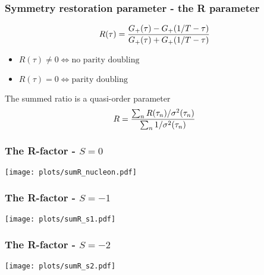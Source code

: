 \documentclass[11pt]{beamer}
\begin{document}
\begin{frame}
  \frametitle{Symmetry restoration parameter - the R parameter}

  \begin{equation*}
    R(\tau) = \frac{%
      G_+(\tau) - G_+(1/T - \tau)
      }{%
      G_+(\tau) + G_+(1/T - \tau)
    }
  \end{equation*}

  \begin{itemize}
    \item $R(\tau) \neq 0 \Leftrightarrow \text{no parity doubling}$
    \item $R(\tau) = 0 \Leftrightarrow \text{parity doubling}$
  \end{itemize}

  \vspace{5mm}

  The summed ratio is a quasi-order parameter \scalebox{0.8}{(as we will see)}
  \begin{equation*}
    R = \frac{%
      \sum_n R(\tau_n) / \sigma^2(\tau_n)
      }{%
      \sum_n 1 / \sigma^2(\tau_n)
    }
  \end{equation*}

\end{frame}

\begin{frame}
  \frametitle{The R-factor - $S = 0$}

  \vspace{6mm}
  \begin{center}
    \hspace*{-5mm}
    \texttt{[image: plots/sumR\_nucleon.pdf]}
  \end{center}

\end{frame}

\begin{frame}
  \frametitle{The R-factor - $S = -1$}

  \vspace{6mm}
  \begin{center}
    \hspace*{-5mm}
    \texttt{[image: plots/sumR\_s1.pdf]}
  \end{center}

\end{frame}

\begin{frame}
  \frametitle{The R-factor - $S = -2$}

  \vspace{6mm}
  \begin{center}
    \hspace*{-5mm}
    \texttt{[image: plots/sumR\_s2.pdf]}
  \end{center}

\end{frame}
\end{document}
